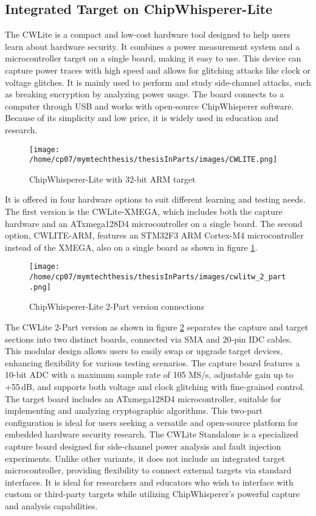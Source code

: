 \subsection{Integrated Target on ChipWhisperer-Lite}
The CWLite is a compact and low-cost hardware tool designed to help users learn about hardware security. It combines a power measurement system and a microcontroller target on a single board, making it easy to use. This device \cite{chipwhisperer_lite_capture} can capture power traces with high speed and allows for glitching attacks like clock or voltage glitches. It is mainly used to perform and study side-channel attacks, such as breaking encryption by analyzing power usage. The board connects to a computer through USB and works with open-source ChipWhisperer software. Because of its simplicity and low price, it is widely used in education and research.
\begin{figure}[h]
    \centering
    \texttt{[image: /home/cp07/mymtechthesis/thesisInParts/images/CWLITE.png]}
    \caption{ChipWhisperer-Lite with 32-bit ARM target}
    \label{lite_target}
\end{figure}\newline
It is offered in four hardware options \cite{chipwhisperer_lite2} to suit different learning and testing needs. The first version is the CWLite-XMEGA, which includes both the capture hardware and an ATxmega128D4 microcontroller on a single board. The second option, CWLITE-ARM, features an STM32F3 ARM Cortex-M4 microcontroller instead of the XMEGA, also on a single board as shown in figure \ref{lite_target}. 
\begin{figure}[h]
    \centering
    \texttt{[image: /home/cp07/mymtechthesis/thesisInParts/images/cwlitw\_2\_part.png]}
    \caption{ChipWhisperer-Lite 2-Part version connections}
    \label{fig:lite_2_part}
\end{figure}\newline
The CWLite 2-Part version as shown in figure \ref{fig:lite_2_part} separates the capture and target sections into two distinct boards, connected via SMA and 20-pin IDC cables. This modular design allows users to easily swap or upgrade target devices, enhancing flexibility for various testing scenarios. The capture board features a 10-bit ADC with a maximum sample rate of 105 MS/s, adjustable gain up to +55\,dB, and supports both voltage and clock glitching with fine-grained control. The target board includes an ATxmega128D4 microcontroller, suitable for implementing and analyzing cryptographic algorithms. This two-part configuration is ideal for users seeking a versatile and open-source platform for embedded hardware security research.\newline
The CWLite Standalone is a specialized capture board designed for side-channel power analysis and fault injection experiments. Unlike other variants, it does not include an integrated target microcontroller, providing flexibility to connect external targets via standard interfaces. It is ideal for researchers and educators who wish to interface with custom or third-party targets while utilizing ChipWhisperer's powerful capture and analysis capabilities.


